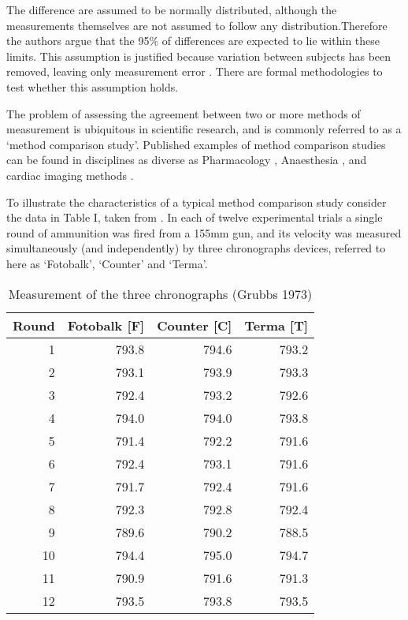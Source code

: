 \documentclass[12pt, a4paper]{report}
\begin{document}
The difference are assumed to be normally distributed, although the measurements themselves are not assumed to follow any distribution.Therefore the authors argue that the 95\% of differences are expected to lie within these limits. This assumption is justified because variation between subjects has been removed, leaving only measurement error \citep{BA86}. There are formal methodologies to test whether this assumption holds.


The problem of assessing the agreement between two or more methods
of measurement is ubiquitous in scientific research, and is
commonly referred to as a `method comparison study'. Published
examples of method comparison studies can be found in disciplines
as diverse as Pharmacology \citep{ludbrook97}, Anaesthesia
\citep{Myles}, and cardiac imaging methods \citep{Krumm}.
\smallskip

To illustrate the characteristics of a typical method comparison
study consider the data in Table I, taken from \citet{Grubbs73}.
In each of twelve experimental trials a single round of ammunition
was fired from a 155mm gun, and its velocity was measured
simultaneously (and independently) by three chronographs devices,
referred to here as `Fotobalk', `Counter' and `Terma'.
\smallskip


\newpage

\begin{table}[ht]
\begin{center}
\begin{tabular}{rrrr}
  \hline
  Round& Fotobalk [F] & Counter [C]& Terma [T]\\
  \hline
  1 & 793.8 & 794.6 & 793.2 \\
  2 & 793.1 & 793.9 & 793.3 \\
  3 & 792.4 & 793.2 & 792.6 \\
  4 & 794.0 & 794.0 & 793.8 \\
  5 & 791.4 & 792.2 & 791.6 \\
  6 & 792.4 & 793.1 & 791.6 \\
  7 & 791.7 & 792.4 & 791.6 \\
  8 & 792.3 & 792.8 & 792.4 \\
  9 & 789.6 & 790.2 & 788.5 \\
  10 & 794.4 & 795.0 & 794.7 \\
  11 & 790.9 & 791.6 & 791.3 \\
  12 & 793.5 & 793.8 & 793.5 \\
   \hline
\end{tabular}
\caption{Measurement of the three chronographs (Grubbs 1973)}
\end{center}
\end{table}
\end{document}
